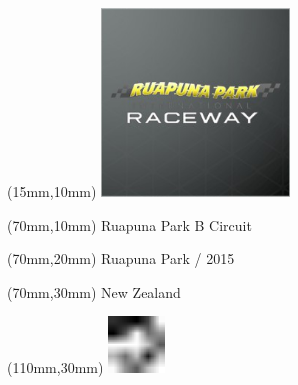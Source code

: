 \null\newpage
\begin{textblock*}{50mm}(15mm,10mm)%
\includegraphics[width=50mm]{LG/RUPU.png}
\end{textblock*}
\begin{textblock*}{130mm}(70mm,10mm)%
{\fontsize{20}{20}\selectfont Ruapuna Park B Circuit}\\
\end{textblock*}
\begin{textblock*}{120mm}(70mm,20mm)%
{\fontsize{16}{16}\selectfont Ruapuna Park / 2015}\\
\end{textblock*}
\begin{textblock*}{120mm}(70mm,30mm)%
{\fontsize{12}{12}\selectfont New Zealand}
\end{textblock*}
\begin{textblock*}{30mm}(110mm,30mm)%
\centering
\includegraphics[height=15mm]{icons/fa-rotate-left.pdf}
\end{textblock*}
